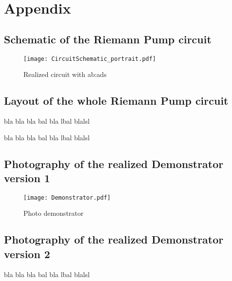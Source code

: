 \renewcommand*\thechapter{}
\renewcommand*\thesection{\Alph{section}}
\chapter*{Appendix}

\section{Schematic of the Riemann Pump circuit}
\label{app:schematic}
\begin{figure}[ht]
	\centering
  \texttt{[image: CircuitSchematic\_portrait.pdf]}
	\caption{Realized circuit with \gls{ab:ads}}
	\label{fig:Circuitschematic}
\end{figure}

\newpage
\section{Layout of the whole Riemann Pump circuit}

bla bla bla bal bla lbal blalsl

bla bla bla bal bla lbal blalsl

\newpage
\section{Photography of the realized Demonstrator version 1}

\begin{figure}[htb!]
   \centering
   \texttt{[image: Demonstrator.pdf]}
   \caption{Photo demonstrator}
   \label{pic:DemonstratorDDRiXY6}
\end{figure}

\section{Photography of the realized Demonstrator version 2}

bla bla bla bal bla lbal blalsl